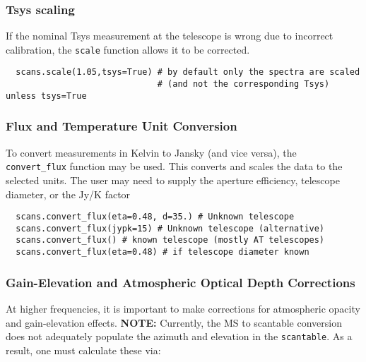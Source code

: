 \subsubsection{Tsys scaling}
\label{subsubsection:sd.asap.calib.tsys}

If the nominal Tsys measurement at the telescope is wrong due to
incorrect calibration, the {\tt scale} function allows it to be corrected.  

\small
\begin{verbatim}
  scans.scale(1.05,tsys=True) # by default only the spectra are scaled
                              # (and not the corresponding Tsys) unless tsys=True
\end{verbatim}
\normalsize


\subsubsection{Flux and Temperature Unit Conversion}
\label{subsubsection:sd.asap.calib.fluxunit}

To convert measurements in Kelvin to Jansky (and vice versa), the {\tt
convert\_flux} function may be used. This converts and scales the data
to the selected units. The user may need to supply the aperture
efficiency, telescope diameter, or the Jy/K factor

\small
\begin{verbatim}
  scans.convert_flux(eta=0.48, d=35.) # Unknown telescope
  scans.convert_flux(jypk=15) # Unknown telescope (alternative)
  scans.convert_flux() # known telescope (mostly AT telescopes)
  scans.convert_flux(eta=0.48) # if telescope diameter known
\end{verbatim}
\normalsize

\subsubsection{Gain-Elevation and Atmospheric Optical Depth Corrections}
\label{subsubsection:sd.asap.calib.gain}

At higher frequencies, it is important to make corrections for
atmospheric opacity and gain-elevation effects. {\bf NOTE:} Currently,
the MS to scantable conversion does not adequately populate the
azimuth and elevation in the {\tt scantable}. As a result, one must
calculate these via:

